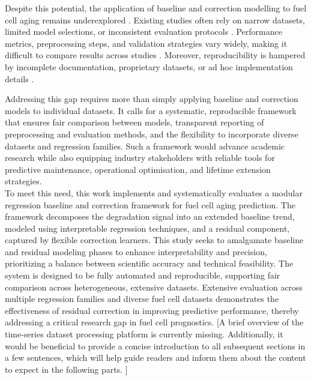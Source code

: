 Despite this potential, the application of baseline and correction modelling to fuel cell aging remains underexplored \cite{Humphreys2020Prognostics,Shah2021IJHE,Song2019Review}. Existing studies often rely on narrow datasets, limited model selections, or inconsistent evaluation protocols \cite{Humphreys2020Prognostics,Attia2020BatteryScience}. Performance metrics, preprocessing steps, and validation strategies vary widely, making it difficult to compare results across studies \cite{Karpatne2019TGDS,Willard2022NRP}. Moreover, reproducibility is hampered by incomplete documentation, proprietary datasets, or ad hoc implementation details \cite{Raissi2019PINN,IEA2022GlobalHydrogen}.  

Addressing this gap requires more than simply applying baseline and correction models to individual datasets. It calls for a systematic, reproducible framework that ensures fair comparison between models, transparent reporting of preprocessing and evaluation methods, and the flexibility to incorporate diverse datasets and regression families\cite{Willard2022NRP,Karpatne2019TGDS,Severson2019BatteryPrognostics}. Such a framework would advance academic research while also equipping industry stakeholders with reliable tools for predictive maintenance, operational optimisation, and lifetime extension strategies\cite{Rasouli2022DigitalTwin,Nguyen2021EnergiesPEMFCdurability,HydrogenCouncil2020Report}.
\noindent\\
To meet this need, this work implements and systematically evaluates a modular regression baseline and correction framework for fuel cell aging prediction. The framework decomposes the degradation signal into an extended baseline trend, modeled using interpretable regression techniques, and a residual component, captured by flexible correction learners. This study seeks to amalgamate baseline and residual modeling phases to enhance interpretability and precision, prioritizing a balance between scientific accuracy and technical feasibility. The system is designed to be fully automated and reproducible, supporting fair comparison across heterogeneous, extensive datasets. Extensive evaluation across multiple regression families and diverse fuel cell datasets demonstrates the effectiveness of residual correction in improving predictive performance, thereby addressing a critical research gap in fuel cell prognostics. [A brief overview of the time-series dataset processing platform is currently missing. Additionally, it would be beneficial to provide a concise introduction to all subsequent sections in a few sentences, which will help guide readers and inform them about the content to expect in the following parts.
]


